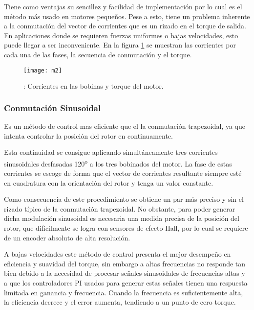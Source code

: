 Tiene como ventajas su sencillez y facilidad de implementación por lo cual es el método más usado en motores pequeños. Pese a esto, tiene un problema inherente a la conmutación del vector de corrientes que es un rizado en el torque de salida. En aplicaciones donde se requieren fuerzas uniformes o bajas velocidades, esto puede llegar a ser inconveniente. En la figura \ref{fig:corrientes_bobinas} se muestran las corrientes por cada una de las fases, la secuencia de conmutación y el torque.

\begin{figure}[h]
  \centering
  \texttt{[image: m2]}
  \caption{: Corrientes en las bobinas y torque del motor.}\label{fig:corrientes_bobinas}
\end{figure}

\cite{brushless_control}


\subsubsection{Conmutación Sinusoidal}
\label{subsubsection: conmutacion_sin}

Es un método de control mas eficiente que el la conmutación trapezoidal, ya que intenta controlar la posición del rotor en continuamente.

Esta continuidad se consigue aplicando simultáneamente tres corrientes sinusoidales
desfasadas 120\textsuperscript{o} a los tres bobinados del motor. La fase de estas corrientes se escoge de forma que el vector de corrientes resultante siempre esté en cuadratura con la orientación del rotor y tenga un valor constante.

Como consecuencia de este procedimiento se obtiene un par más preciso y sin el rizado típico de la conmutación trapezoidal. No obstante, para poder generar dicha modulación sinusoidal es necesaria una medida precisa de la posición del rotor, que difícilmente se logra con sensores de efecto Hall, por lo cual se requiere de un encoder absoluto de alta resolución.

A bajas velocidades este método de control presenta el mejor desempeño en eficiencia y suavidad del torque, sin embargo a altas frecuencias no responde tan bien debido a la necesidad de procesar señales sinusoidales de frecuencias altas y a que los controladores PI usados para generar estas señales tienen una respuesta limitada en ganancia y frecuencia. Cuando la frecuencia es suficientemente alta, la eficiencia decrece y el error aumenta, tendiendo a un punto de cero torque.


